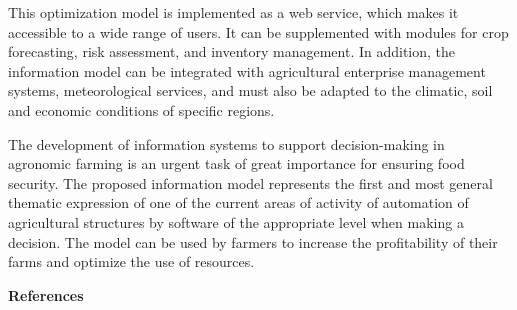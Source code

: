 \begin{multicols}{2}
This optimization model is implemented as a web service, which makes it
accessible to a wide range of users. It can be supplemented with modules
for crop forecasting, risk assessment, and inventory management. In
addition, the information model can be integrated with agricultural
enterprise management systems, meteorological services, and must also be
adapted to the climatic, soil and economic conditions of specific
regions.

The development of information systems to support decision-making in
agronomic farming is an urgent task of great importance for ensuring
food security. The proposed information model represents the first and
most general thematic expression of one of the current areas of activity
of automation of agricultural structures by software of the appropriate
level when making a decision. The model can be used by farmers to
increase the profitability of their farms and optimize the use of
resources.
\end{multicols}

\begin{center}
{\bfseries References}
\end{center}

